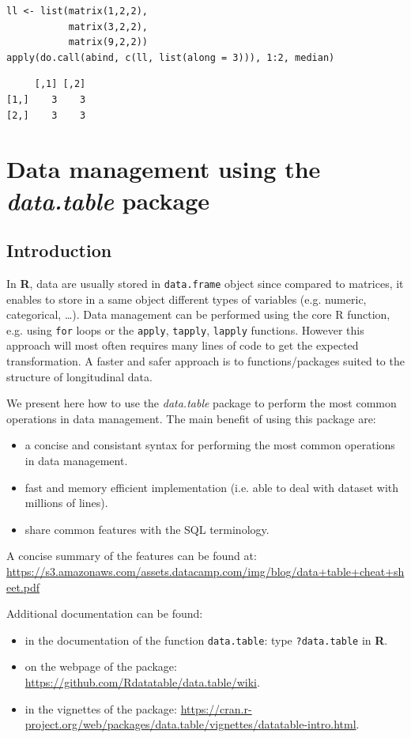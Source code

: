 \documentclass{article}
\newcommand\Rlogo{\textbf{\textsf{R}}\xspace}
\begin{document}
\lstset{language=r,label= ,caption= ,captionpos=b,numbers=none}
\begin{lstlisting}
ll <- list(matrix(1,2,2),
		   matrix(3,2,2),
		   matrix(9,2,2))
apply(do.call(abind, c(ll, list(along = 3))), 1:2, median)
\end{lstlisting}

\begin{verbatim}
     [,1] [,2]
[1,]    3    3
[2,]    3    3
\end{verbatim}

\section{Data management using the \emph{data.table} package}
\label{sec:orgc00da6a}
\subsection{Introduction}
\label{sec:org4721132}
In \Rlogo, data are usually stored in \texttt{data.frame} object since compared
to matrices, it enables to store in a same object different types of
variables (e.g. numeric, categorical, \ldots{}). Data management can be
performed using the core R function, e.g. using \texttt{for} loops or
the \texttt{apply}, \texttt{tapply}, \texttt{lapply} functions.  However this approach will
most often requires many lines of code to get the expected
transformation.  A faster and safer approach is to functions/packages
suited to the structure of longitudinal data.

\bigskip

We present here how to use the \emph{data.table} package to perform the
most common operations in data management. The main benefit of using
this package are:
\begin{itemize}
\item a concise and consistant syntax for performing the most common
operations in data management.
\item fast and memory efficient implementation (i.e. able to deal with
dataset with millions of lines).
\item share common features with the SQL terminology.
\end{itemize}
A concise summary of the features can be found at:
\url{https://s3.amazonaws.com/assets.datacamp.com/img/blog/data+table+cheat+sheet.pdf}

\bigskip

Additional documentation can be found:
\begin{itemize}
\item in the documentation of the function \texttt{data.table}: type \texttt{?data.table} in \Rlogo.
\item on the webpage of the package: \url{https://github.com/Rdatatable/data.table/wiki}.
\item in the vignettes of the package: \url{https://cran.r-project.org/web/packages/data.table/vignettes/datatable-intro.html}.
\end{itemize}
\end{document}
